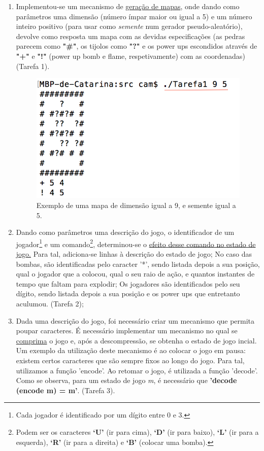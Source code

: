 \documentclass[a4paper]{article}
\begin{document}
\begin{enumerate}
	\item Implementou-se um mecanismo de \underline{geração de mapas}, onde dando como parâmetros uma
	dimensão (número ímpar maior ou igual a 5) e um número inteiro positivo (para usar como \emph{semente}
	num gerador pseudo-aleatório), devolve como resposta um mapa com as devidas especificações (as pedras
	parecem como \textbf{"\#"}, os tijolos como \textbf{"?"} e os power ups escondidos através de \textbf{"+"} e
	\textbf{"!"} (power up bomb e flame, respetivamente) com as coordenadas) (Tarefa 1).
	
\begin{figure}[H]
\centering 
\includegraphics[scale=0.50]{tarefa1}
\caption{Exemplo de uma mapa de dimensão igual a 9, e semente igual a 5.}
\end{figure}

	\item Dando como parâmetros uma descrição do jogo, o identificador de um jogador\footnote{Cada 
  jogador é identificado por um dígito entre 0 e 3.} e um comando\footnote{Podem ser os caracteres \textbf{‘U’}
  (ir para cima), \textbf{‘D’} (ir para baixo), \textbf{‘L’} (ir para a esquerda), \textbf{‘R’} 
  (ir para a direita) e \textbf{‘B’} (colocar uma bomba).}, determinou-se o \underline{efeito desse comando no 
  estado de jogo.}
  	Para tal, adiciona-se linhas à descrição do estado de jogo; No caso das bombas, são identificadas pelo
  	caracter '*', sendo listada depois a sua posição, qual o jogador que a colocou, qual o seu raio
  	de ação, e quantos instantes de tempo que faltam para explodir; Os jogadores são identificados pelo
  	seu dígito, sendo listada depois a sua posição e os power ups que entretanto aculumou. (Tarefa 2);
	\item Dada uma descrição do jogo, foi necessário criar um mecanismo que permita poupar caracteres. 
	É necessário implementar um mecanismo no qual se \underline{comprima} o jogo e, após a descompressão, se obtenha o 
	estado de jogo incial. Um exemplo da utilização deste mecanismo é ao colocar o jogo em pausa: existem 
	certos caracteres que são sempre fixos ao longo do jogo. Para tal, utilizamos a função \textsf{'encode'}. 
	Ao retomar o jogo, é utilizada a função \textsf{'decode'}. Como se observa, para um estado de jogo \textit{m}, é necessário que \textbf{'decode (encode m) = m'}. (Tarefa 3).
\end{enumerate}
\end{document}
